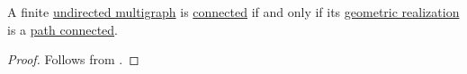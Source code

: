 \begin{corollary}\label{thm:undirected_multigraph_geometric_realization_connectedness}
  A finite \hyperref[def:undirected_multigraph]{undirected multigraph} is \hyperref[def:undirected_multigraph_connectedness]{connected} if and only if its \hyperref[def:quiver_geometric_realization/undirected]{geometric realization} is a \hyperref[def:path_connected]{path connected}.
\end{corollary}
\begin{proof}
  Follows from .
\end{proof}
